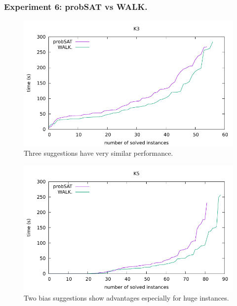 \documentclass[12pt,a4paper,twoside]{scrartcl}
\numberwithin{equation}{section}
\begin{document}
\subsubsection{Experiment 6: probSAT vs WALK.}  
  \begin{figure}[H]
\begin{center}
  \includegraphics[scale = 1]{DATA/K3/e4w.pdf}
  \end{center}
  \caption{Three suggestions have very similar performance.}
  \label{Experiment 6 k3-w cactus plot}
  \end{figure}
  \begin{figure}[H]
\begin{center}
  \includegraphics[scale = 1]{DATA/K5/e4w.pdf}
  \end{center}
  \caption{Two bias suggestions show advantages especially for huge instances.}
  \label{Experiment 6 k5-w cactus plot}
  \end{figure}
\end{document}
